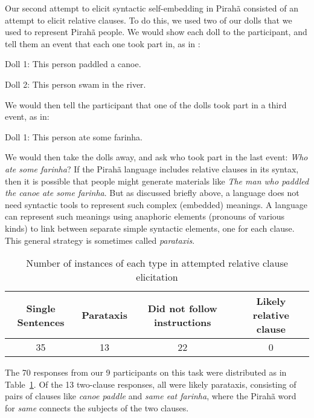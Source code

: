 \documentclass{article}
\begin{document}
Our second attempt to elicit syntactic self-embedding in Pirahã consisted of an attempt to elicit relative clauses.  To do this, we used two of our dolls that we used to represent Pirahã people. We would show each doll to the participant, and tell them an event that each one took part in, as in :

\begin{myexample}
\label{piraha_rcs}
\begin{examples}
\item \label{piraha_rcs1} Doll 1: This person paddled a canoe.
\item \label{piraha_rcs2} Doll 2: This person swam in the river.
\end{examples}
\end{myexample}

We would then tell the participant that one of the dolls took part in a third event, as in:

\begin{myexample}
\label{piraha_rcs3}
Doll 1: This person ate some farinha.
\end{myexample}

We would then take the dolls away, and ask who took part in the last event: \textit{Who ate some farinha}?  If the Pirahã language includes relative clauses in its syntax, then it is possible that people might generate materials like \textit{The man who paddled the canoe ate some farinha}. But as discussed briefly above, a language does not need syntactic tools to represent such complex (embedded) meanings.  A language can represent such meanings using anaphoric elements (pronouns of various kinds) to link between separate simple syntactic elements, one for each clause.  This general strategy is sometimes called \textit{parataxis}.


\begin{table}[]
    \centering
    \begin{tabular}{c c c c}
         Single Sentences & Parataxis & Did not follow instructions & Likely relative clause  \\
         \hline 
         35 & 13 & 22 & 0 
    \end{tabular}
    \caption{Number of instances of each type in attempted relative clause elicitation}
    \label{table1}
\end{table}

The 70 responses from our 9 participants on this task were distributed as in Table~\ref{table1}.  Of the 13 two-clause responses, all were likely parataxis, consisting of pairs of clauses like \textit{canoe paddle} and \textit{same eat farinha}, where the Pirahã word for \textit{same} connects the subjects of the two clauses.
\end{document}
